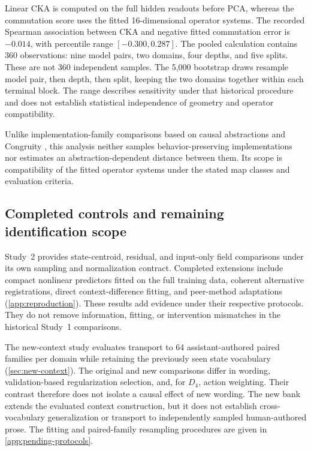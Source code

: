 Linear CKA is computed on the full hidden readouts
before PCA, whereas the commutation score uses
the fitted 16-dimensional operator systems.
The recorded Spearman association between CKA
and negative fitted commutation error is
$-0.014$, with percentile range
$[-0.300,0.287]$.
The pooled calculation contains 360 observations:
nine model pairs, two domains, four depths,
and five splits.
These are not 360 independent samples.
The 5,000 bootstrap draws resample model pair,
then depth, then split, keeping the two domains
together within each terminal block.
The range describes sensitivity under that
historical procedure and does not establish
statistical independence of geometry and
operator compatibility.

Unlike implementation-family comparisons based
on causal abstractions and Congruity
\citep{sun2026tracking}, this analysis neither
samples behavior-preserving implementations nor
estimates an abstraction-dependent distance
between them.
Its scope is compatibility of the fitted
operator systems under the stated map classes
and evaluation criteria.


\subsection{Completed controls and remaining identification scope}

Study~2 provides state-centroid, residual, and
input-only field comparisons under its own
sampling and normalization contract.
Completed extensions include compact nonlinear
predictors fitted on the full training data,
coherent alternative registrations, direct
context-difference fitting, and peer-method
adaptations (\cref{app:reproduction}).
These results add evidence under their respective
protocols.
They do not remove information, fitting, or
intervention mismatches in the historical
Study~1 comparisons.

The new-context study evaluates transport to
64 assistant-authored paired families per domain
while retaining the previously seen state
vocabulary (\cref{sec:new-context}).
The original and new comparisons differ in
wording, validation-based regularization selection,
and, for $D_4$, action weighting.
Their contrast therefore does not isolate a
causal effect of new wording.
The new bank extends the evaluated context
construction, but it does not establish
cross-vocabulary generalization or transport
to independently sampled human-authored prose.
The fitting and paired-family resampling
procedures are given in
\cref{app:pending-protocols}.

